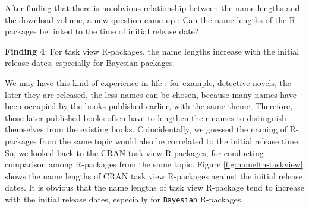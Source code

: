 \documentclass[
]{book}
\newenvironment{discovery}[1]{%
  \begin{tcolorbox}[colback=blue!30,colframe=blue!80!black]#1}{\end{tcolorbox}}
\begin{document}
After finding that there is no obvious relationship between the name lengths and the download volume, a new question came up : Can the name lengths of the R-packages be linked to the time of initial release date?

\begin{discovery}
\textbf{Finding 4}: For task view R-packages, the name lengths increase
with the initial release dates, especially for Bayesian packages.
\end{discovery}

We may have this kind of experience in life : for example, detective novels, the later they are released, the less names can be chosen, because many names have been occupied by the books published earlier, with the same theme. Therefore, those later published books often have to lengthen their names to distinguish themselves from the existing books. Coincidentally, we guessed the naming of R-packages from the same topic would also be correlated to the initial release time. So, we looked back to the CRAN task view R-packages\citep{crantaskviews}, for conducting comparison among R-packages from the same topic. Figure \ref{fig:namelth-taskview} shows the name lengths of CRAN task view R-packages against the initial release dates. It is obvious that the name lengths of task view R-package tend to increase with the initial release dates, especially for \texttt{Bayesian} R-packages.
\end{document}
